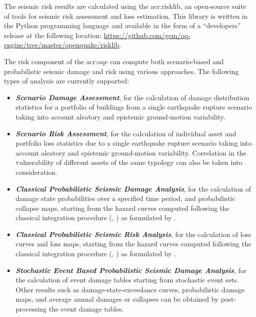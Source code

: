 
The seismic risk results are calculated using the \gls{acr:risklib}, 
an open-source suite of tools for seismic risk assessment and
loss estimation. This library is written in the Python programming language
and available in the form of a ``developers'' release at the following location:
\href{https://github.com/gem/oq-engine/tree/master/openquake/risklib}{https://github.com/gem/oq-engine/tree/master/openquake/risklib}.

The risk component of the \glsdesc{acr:oqe} can compute both scenario-based and
probabilistic seismic damage and risk using various approaches. The following
types of analysis are currently supported:

\begin{itemize}

    \item \textit{\textbf{Scenario Damage Assessment}}, for the
	calculation of damage distribution statistics for a portfolio of buildings
	from a single earthquake rupture scenario taking into account aleatory and
	epistemic ground-motion variability.

    \item \textit{\textbf{Scenario Risk Assessment}}, for the calculation of
	individual asset and portfolio loss statistics due to a single earthquake
	rupture scenario taking into account aleatory and epistemic ground-motion
	variability. Correlation in the vulnerability of different assets of the
	same typology can also be taken into consideration.

	\item \textit{\textbf{Classical Probabilistic Seismic Damage Analysis}}, for 
	the calculation of damage state probabilities over a specified time period,  
	and probabilistic collapse maps, starting from the hazard curves 
	computed following the classical integration procedure (\cite{cornell1968}, 
	\citet{mcguire1976}) as formulated by \cite{field2003}.

    \item \textit{\textbf{Classical Probabilistic Seismic Risk Analysis}}, for the
	calculation of loss curves and loss maps, starting from the hazard curves 
	computed following the classical integration procedure (\cite{cornell1968}, 
	\citet{mcguire1976}) as formulated by \cite{field2003}.

	\item \textit{\textbf{Stochastic Event Based Probabilistic Seismic Damage Analysis}}, 
	for the calculation of event damage tables starting from stochastic event sets.
	Other results such as damage-state-exceedance curves, probabilistic damage maps, 
	and average annual damages or collapses can be obtained by 
	post-processing the event damage tables.


\end{itemize}
